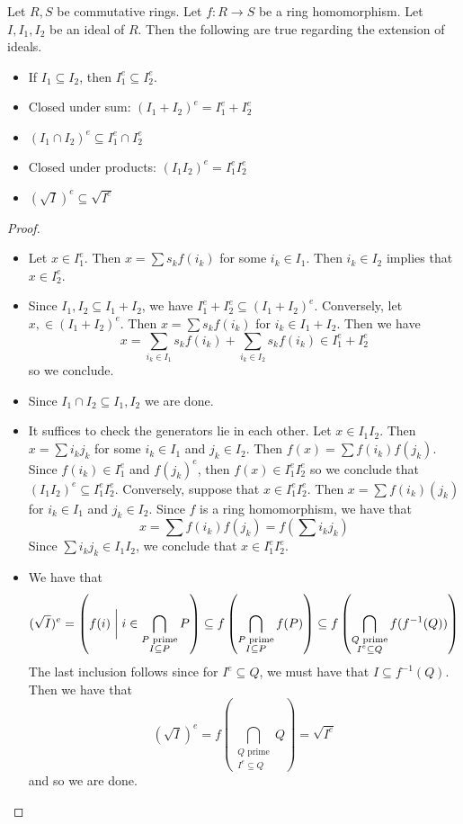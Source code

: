 \documentclass[a4paper]{article}
\begin{document}
\begin{prp}{}{} Let $R,S$ be commutative rings. Let $f:R\to S$ be a ring homomorphism. Let $I,I_1,I_2$ be an ideal of $R$. Then the following are true regarding the extension of ideals. 
\begin{itemize}
\item If $I_1\subseteq I_2$, then $I_1^e\subseteq I_2^e$. 
\item Closed under sum: $(I_1+I_2)^e=I_1^e+I_2^e$
\item $(I_1\cap I_2)^e\subseteq I_1^e\cap I_2^e$
\item Closed under products: $(I_1I_2)^e=I_1^eI_2^e$
\item $(\sqrt{I})^e\subseteq\sqrt{I^e}$
\end{itemize} \tcbline
\begin{proof}~\\
\begin{itemize}
\item Let $x\in I_1^e$. Then $x=\sum s_kf(i_k)$ for some $i_k\in I_1$. Then $i_k\in I_2$ implies that $x\in I_2^e$. 
\item Since $I_1,I_2\subseteq I_1+I_2$, we have $I_1^e+I_2^e\subseteq(I_1+I_2)^e$. Conversely, let $x,\in(I_1+I_2)^e$. Then $x=\sum s_kf(i_k)$ for $i_k\in I_1+I_2$. Then we have $$x=\sum_{i_k\in I_1}s_kf(i_k)+\sum_{i_k\in I_2}s_kf(i_k)\in I_1^e+I_2^e$$ so we conclude. 
\item Since $I_1\cap I_2\subseteq I_1,I_2$ we are done. 
\item It suffices to check the generators lie in each other. Let $x\in I_1I_2$. Then $x=\sum i_kj_k$ for some $i_k\in I_1$ and $j_k\in I_2$. Then $f(x)=\sum f(i_k)f(j_k)$. Since $f(i_k)\in I_1^e$ and $f(j_k)^e$, then $f(x)\in I_1^eI_2^e$ so we conclude that $(I_1I_2)^e\subseteq I_1^eI_2^e$. Conversely, suppose that $x\in I_1^eI_2^e$. Then $x=\sum f(i_k)(j_k)$ for $i_k\in I_1$ and $j_k\in I_2$. Since $f$ is a ring homomorphism, we have that $$x=\sum f(i_k)f(j_k)=f\left(\sum i_kj_k\right)$$ Since $\sum i_kj_k\in I_1I_2$, we conclude that $x\in I_1^eI_2^e$. 
\item We have that $$
(\sqrt{I})^e=\left(f(i)\;\bigg{|}\;i\in\bigcap_{\substack{P\text{ prime}\\I\subseteq P}}P\right)\subseteq f\left(\bigcap_{\substack{P\text{ prime}\\I\subseteq P}}f(P)\right)\subseteq f\left(\bigcap_{\substack{Q\text{ prime}\\I^e\subseteq Q}}f(f^{-1}(Q))\right)$$ The last inclusion follows since for $I^e\subseteq Q$, we must have that $I\subseteq f^{-1}(Q)$. Then we have that $$(\sqrt{I})^e=f\left(\bigcap_{\substack{Q\text{ prime}\\I^e\subseteq Q}}Q\right)=\sqrt{I^e}$$ and so we are done. 
\end{itemize}
\end{proof}
\end{prp}
\end{document}
